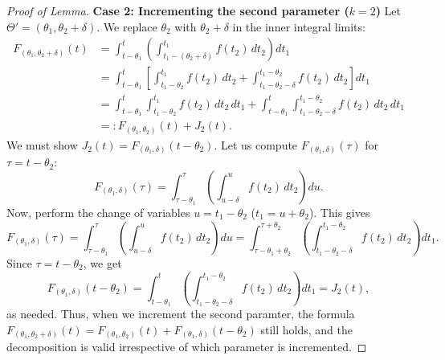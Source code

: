 \documentclass[10pt,reqno]{amsart}
\theoremstyle{definition}
\begin{document}
\begin{proof}[Proof of Lemma]
	\textbf{Case 2: Incrementing the second parameter ($k=2$)}
	Let $\Theta' = (\theta_1, \theta_2+\delta)$. We replace $\theta_2$ with $\theta_2+\delta$ in the inner integral limits:
	\begin{align*}
	F_{(\theta_1, \theta_2+\delta)}(t) &= \int_{t-\theta_1}^t \left( \int_{t_1-(\theta_2+\delta)}^{t_1} f(t_2) \, dt_2 \right) dt_1\\
	&= \int_{t-\theta_1}^t \left[ \int_{t_1-\theta_2}^{t_1} f(t_2) \, dt_2 + \int_{t_1-\theta_2-\delta}^{t_1-\theta_2} f(t_2) \, dt_2 \right] dt_1\\
	&= \int_{t-\theta_1}^t \int_{t_1-\theta_2}^{t_1} f(t_2) \, dt_2 \, dt_1 + \int_{t-\theta_1}^t \int_{t_1-\theta_2-\delta}^{t_1-\theta_2} f(t_2) \, dt_2 \, dt_1\\
	&=:F_{(\theta_1, \theta_2)}(t)+J_2(t).
	\end{align*}
		We must show $J_2(t) =F_{(\theta_1, \delta)}(t-\theta_2)$.
		Let us compute $F_{(\theta_1, \delta)}(\tau)$ for $\tau = t-\theta_2$:
		\[
		F_{(\theta_1, \delta)}(\tau) = \int_{\tau-\theta_1}^\tau \left( \int_{u-\delta}^u f(t_2) \, dt_2 \right) du.
		\]
		Now, perform the change of variables $u = t_1 - \theta_2$ ($t_1=u+\theta_2$). This gives
		\[
		F_{(\theta_1, \delta)}(\tau) = \int_{\tau-\theta_1}^\tau \left( \int_{u-\delta}^u f(t_2) \, dt_2 \right) du
		= 
		\int_{\tau-\theta_1+\theta_2}^{\tau+\theta_2} \left( \int_{t_1-\theta_2-\delta}^{t_1-\theta_2} f(t_2) \, dt_2 \right)
		dt_1.
		\]
		Since $\tau=t-\theta_2$, we get
		\[
		F_{(\theta_1, \delta)}(t-\theta_2) 
		=	\int_{t-\theta_1}^{t} \left( \int_{t_1-\theta_2-\delta}^{t_1-\theta_2} f(t_2) \, dt_2 \right)
		dt_1=J_2(t),
		\]
		as needed. 
	Thus, when we increment the second paramter, the formula $F_{(\theta_1, \theta_2+\delta)}(t) = F_{(\theta_1, \theta_2)}(t) + F_{(\theta_1, \delta)}(t-\theta_2)$ still holds, and the decomposition is valid irrespective of which parameter is incremented.
\end{proof}
\end{document}
